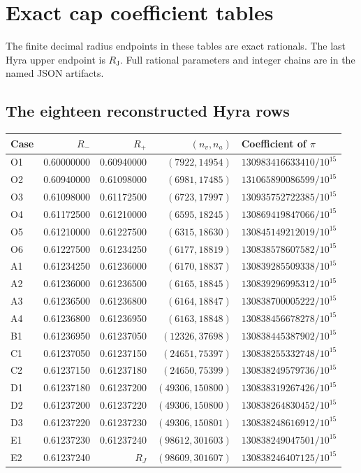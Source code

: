\documentclass[11pt]{article}
\theoremstyle{remark}\newtheorem{remark}[theorem]{Remark}
\newcommand{\RJ}{R_{\mathrm J}}
\begin{document}
\section{Exact cap coefficient tables}\label{hyra:tables}
The finite decimal radius endpoints in these tables are exact rationals. The last Hyra upper endpoint is $\RJ$. Full rational parameters and integer chains are in the named JSON artifacts.
\subsection{The eighteen reconstructed Hyra rows}
\begin{longtable}{@{}lrrrl@{}}
\toprule
Case & $R_-$ & $R_+$ & $(n_v,n_a)$ & Coefficient of $\pi$\\
\midrule\endhead
O1 & 0.60000000 & 0.60940000 & $(7922,14954)$ & $130983416633410/10^{15}$\\
O2 & 0.60940000 & 0.61098000 & $(6981,17485)$ & $131065890086599/10^{15}$\\
O3 & 0.61098000 & 0.61172500 & $(6723,17997)$ & $130935752722385/10^{15}$\\
O4 & 0.61172500 & 0.61210000 & $(6595,18245)$ & $130869419847066/10^{15}$\\
O5 & 0.61210000 & 0.61227500 & $(6315,18630)$ & $130845149212019/10^{15}$\\
O6 & 0.61227500 & 0.61234250 & $(6177,18819)$ & $130838578607582/10^{15}$\\
A1 & 0.61234250 & 0.61236000 & $(6170,18837)$ & $130839285509338/10^{15}$\\
A2 & 0.61236000 & 0.61236500 & $(6165,18845)$ & $130839296995312/10^{15}$\\
A3 & 0.61236500 & 0.61236800 & $(6164,18847)$ & $130838700005222/10^{15}$\\
A4 & 0.61236800 & 0.61236950 & $(6163,18848)$ & $130838456678278/10^{15}$\\
B1 & 0.61236950 & 0.61237050 & $(12326,37698)$ & $130838445387902/10^{15}$\\
C1 & 0.61237050 & 0.61237150 & $(24651,75397)$ & $130838255332748/10^{15}$\\
C2 & 0.61237150 & 0.61237180 & $(24650,75399)$ & $130838249579736/10^{15}$\\
D1 & 0.61237180 & 0.61237200 & $(49306,150800)$ & $130838319267426/10^{15}$\\
D2 & 0.61237200 & 0.61237220 & $(49306,150800)$ & $130838264830452/10^{15}$\\
D3 & 0.61237220 & 0.61237230 & $(49306,150801)$ & $130838248616912/10^{15}$\\
E1 & 0.61237230 & 0.61237240 & $(98612,301603)$ & $130838249047501/10^{15}$\\
E2 & 0.61237240 & $R_J$ & $(98609,301607)$ & $130838246407125/10^{15}$\\
\bottomrule
\end{longtable}
\end{document}

